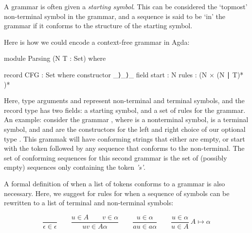 	A grammar is often given a \emph{starting symbol}. This can be considered
	the `topmost' non-terminal symbol in the grammar, and a sequence is said to
	be `in' the grammar if it conforms to the structure of the starting symbol.

	Here is how we could encode a context-free grammar in Agda:

	\begin{code}
		module Parsing (N T : Set) where

		record CFG : Set where
		  constructor _⟩_⟩_
		  field
		    start : N
		    rules : (N × (N ∣ T)* )*
	\end{code}

	Here, type arguments  and  represent non-terminal and
	terminal symbols, and the record type has two fields: a starting symbol,
	and a set of rules for the grammar.  An example: consider the grammar
	, where  is
	a nonterminal symbol,  is a terminal symbol, and  and
	 are the constructors for the left and right choice of our
	optional type . This grammak will have conforming strings that
	either are empty, or start with the token  followed by any
	sequence that conforms to the  non-terminal. The set of
	conforming sequences for this second grammar is the set of (possibly empty)
	sequences only containing the token \emph{'s'}.


	A formal definition of when a list of tokens conforms to a grammar is also
	necessary. Here, we suggest for rules for when a sequence of symbols can be
	rewritten to a list of terminal and non-terminal symbols:

	\[
	\frac{\ }{\epsilon\in\epsilon} \qquad
	\frac{u\in A \qquad v\in\alpha}{uv\in A\alpha} \qquad
	\frac{u\in\alpha}{au\in a\alpha} \qquad
	\frac{u\in\alpha}{u\in A}\ A \mapsto \alpha
	\]


